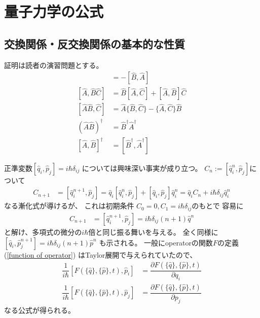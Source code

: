 \appendix
\renewcommand{\theequation}{A.\arabic{section}.\arabic{equation}}
\setcounter{equation}{0}

\section{量子力学の公式}

\subsection{交換関係・反交換関係の基本的な性質}

証明は読者の演習問題とする。
\begin{align}
    [\hat{A}, \hat{B}] &= - [\hat{B}, \hat{A}]
\\
    [\hat{A}, \hat{B}\hat{C}]
   &=
   \hat{B}[\hat{A}, \hat{C}]
+
    [\hat{A}, \hat{B}] \hat{C}
\label{A,BC to B(A,C) + (A,B)C}
\\
    [\hat{A}\hat{B}, \hat{C}]
   &=
   \hat{A}\{\hat{B}, \hat{C}\}
-
    \{\hat{A}, \hat{C}\} \hat{B}
\\
    \left(\hat{A}\hat{B}\right)^\dagger
    &=
    \hat{B}^\dagger\hat{A}^\dagger
\\
    [\hat{A}, \hat{B}]^\dagger
    &=
    [\hat{B}^\dagger, \hat{A}^\dagger]
\end{align}

正準変数$[\hat{q}_i, \hat{p}_j] = i\hbar\delta_{ij}$
については興味深い事実が成り立つ。
$C_n := [\hat{q}^n_i, \hat{p}_j]$について
\begin{align}
    C_{n+1}
    &=
    [\hat{q}^{n+1}_i, \hat{p}_j]
    =
    \hat{q}_i [\hat{q}_i^n, \hat{p}_j]
    +
    [\hat{q}_i, \hat{p}_j] \hat{q}_i^n
    =
    \hat{q}_i C_n
    +
    i\hbar\delta_{ij} \hat{q}_i^n
\end{align}
なる漸化式が導けるが、
これは初期条件
$C_0  = 0, C_1 = i\hbar\delta_{ij}$のもとで
容易に
\begin{align}
    C_{n+1} &= [\hat{q}^{n+1}_i, \hat{p}_j]
    = i\hbar\delta_{ij} (n+1) \hat{q}^n
\end{align}
と解け、多項式の微分の$i\hbar$倍と同じ振る舞いを与える。
全く同様に
$[\hat{q}_i, \hat{p}^{n+1}_j]
= i\hbar\delta_{ij} (n+1) \hat{p}^n$
も示される。
一般にoperatorの関数$F$の定義
(\ref{function of operator})
はTaylor展開で与えられていたので、
\begin{align}
    \dfrac{1}{i\hbar}
    [F(\{ \hat{q} \},\{ \hat{p} \}, t), \hat{p}_i]
    &=
    \dfrac{
        \partial F(\{ \hat{q} \},\{ \hat{p} \}, t)
    }{
        \partial q_i
    }
\\
    \dfrac{1}{i\hbar}
    [F(\{ \hat{q} \},\{ \hat{p} \}, t), \hat{p}_j]
    &=
    \dfrac{
        \partial F(\{ \hat{q} \},\{ \hat{p} \}, t)
    }{
        \partial p_j
    }
\end{align}
なる公式が得られる。

